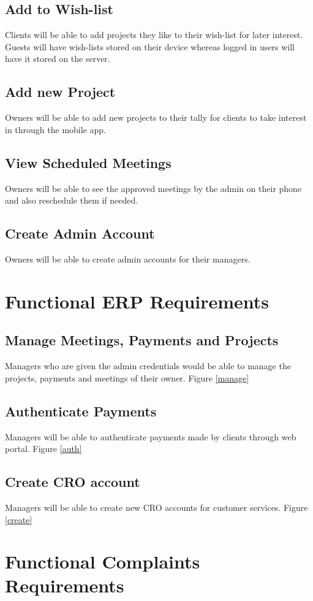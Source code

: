 \subsection{Add to Wish-list}
Clients will be able to add projects they like to their wish-list for later interest. Guests will have wish-lists stored on their device whereas logged in users will have it stored on the server.
\subsection{Add new Project}
Owners will be able to add new projects to their tally for clients to take interest in through the mobile app.
\subsection{View Scheduled Meetings}
Owners will be able to see the approved meetings by the admin on their phone and also reschedule  them if needed.
\subsection{Create Admin Account }
Owners will be able to create admin accounts for their managers.

\section{Functional ERP Requirements}
\subsection{Manage Meetings, Payments and Projects}
Managers who are given the admin credentials would be able to manage the projects, payments and meetings of their owner. Figure \ref{manage}
\subsection{Authenticate Payments}
Managers will be able to authenticate payments made by clients through web portal. Figure \ref{auth}
\subsection{Create CRO account}
Managers will be able to create new CRO accounts for customer services. Figure \ref{create}

\section{Functional Complaints Requirements}
